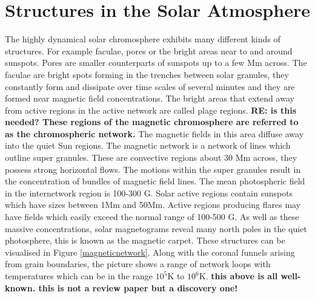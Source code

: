 \documentclass{aastex62}
\begin{document}
\section{Structures in the Solar Atmosphere } \label{sec:structures}

The highly dynamical solar chromosphere exhibits many different kinds of structures. For example faculae, pores or the bright areas near to and around sunspots. Pores are smaller counterparts of sunspots up to a few Mm across. The faculae are bright spots forming in the trenches between solar granules, they constantly form and dissipate over time scales of several minutes and they are formed near magnetic field concentrations. The bright areas that extend away from active regions in the active network are called plage regions. {\bf RE: is this needed? These regions of the magnetic chromosphere are referred to as the chromospheric network.} The magnetic fields in this area diffuse away into the quiet Sun regions. The magnetic network is a network of lines which outline super granules. These are convective regions about 30 Mm across, they possess strong horizontal flows. The motions within the super granules result in the concentration of bundles of magnetic field lines.  The mean photospheric field in the internetwork region is 100-300 G.  Solar active regions contain sunspots which have sizes between 1Mm and 50Mm. Active regions producing flares may have fields which easily exceed the normal range of 100-500 G. As well as these massive concentrations, solar magnetograms reveal many north poles in the quiet photosphere, this is known as the magnetic carpet. These structures can be visualised in Figure \ref{magneticnetwork}. Along with the coronal funnels arising from grain boundaries, the picture shows a range of network loops with temperatures which can be in the range $10^{5}$K to $10^{6}$K. {\bf this above is all well-known. this is not a review paper but a discovery one!}

\end{document}
